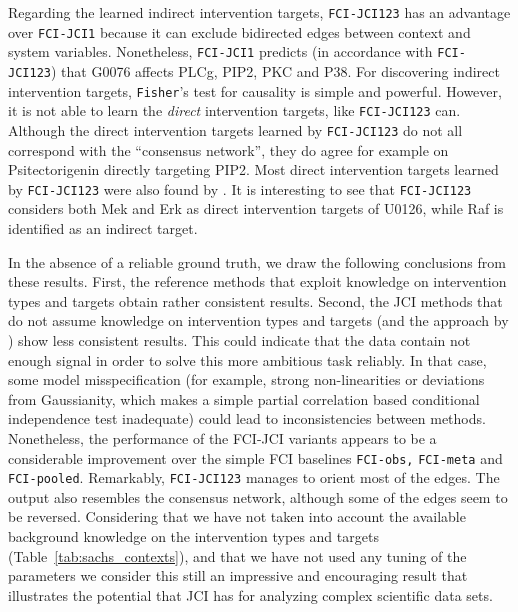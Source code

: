 \documentclass[twoside,11pt]{article}
\newcommand{\alg}[1]{\texttt{#1}}
\begin{document}
Regarding the learned indirect intervention targets, \alg{FCI-JCI123} has an advantage over \alg{FCI-JCI1} because it can exclude bidirected edges between context and system variables. Nonetheless, \alg{FCI-JCI1} predicts (in accordance with \alg{FCI-JCI123}) that G0076 affects PLCg, PIP2, PKC and P38.
For discovering indirect intervention targets, \alg{Fisher}'s test for causality is simple and powerful. However, it is not able to learn the \emph{direct} intervention targets, like \alg{FCI-JCI123} can. Although the direct intervention targets learned by \alg{FCI-JCI123} do not all correspond with the ``consensus network'', they do agree for example on Psitectorigenin directly targeting PIP2. Most direct intervention targets learned by \alg{FCI-JCI123} were also found by \citet{EatonMurphy07}. It is interesting to see that \alg{FCI-JCI123} considers both Mek and Erk as direct intervention targets of U0126, while Raf is identified as an indirect target. 

In the absence of a reliable ground truth, we draw the following conclusions from these results. 
First, the reference methods that exploit knowledge on intervention types and targets obtain rather consistent results.
Second, the JCI methods that do not assume knowledge on intervention types and targets (and the approach by \citet{EatonMurphy07}) show less consistent results.
This could indicate that the data contain not enough signal in order to solve this more ambitious task reliably.
In that case, some model misspecification (for example, strong non-linearities or deviations from Gaussianity, which makes a simple partial correlation based conditional independence test inadequate) could lead to inconsistencies between methods.
Nonetheless, the performance of the FCI-JCI variants appears to be a considerable improvement over the simple FCI baselines
\alg{FCI-obs,} \alg{FCI-meta} and \alg{FCI-pooled}.
Remarkably, \alg{FCI-JCI123} manages to orient most of the edges.
The output also resembles the consensus network, although some of the edges seem to be reversed. 
Considering that we have not taken into account the available background knowledge on the intervention types and targets (Table~\ref{tab:sachs_contexts}), and that we have not used any tuning of the parameters we consider this still an impressive and encouraging result that illustrates the potential that JCI has for analyzing complex scientific data sets.
\end{document}
